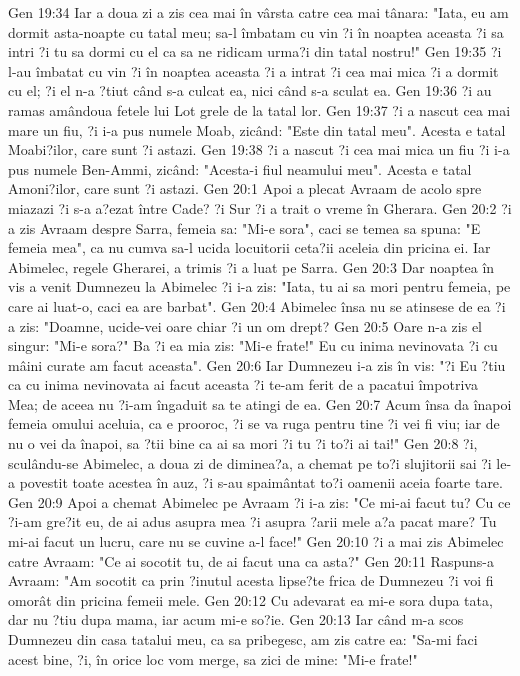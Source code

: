 Gen 19:34  Iar a doua zi a zis cea mai în vârsta catre cea mai tânara: "Iata, eu am dormit asta-noapte cu tatal meu; sa-l îmbatam cu vin ?i în noaptea aceasta ?i sa intri ?i tu sa dormi cu el ca sa ne ridicam urma?i din tatal nostru!"
Gen 19:35  ?i l-au îmbatat cu vin ?i în noaptea aceasta ?i a intrat ?i cea mai mica ?i a dormit cu el; ?i el n-a ?tiut când s-a culcat ea, nici când s-a sculat ea.
Gen 19:36  ?i au ramas amândoua fetele lui Lot grele de la tatal lor.
Gen 19:37  ?i a nascut cea mai mare un fiu, ?i i-a pus numele Moab, zicând: "Este din tatal meu". Acesta e tatal Moabi?ilor, care sunt ?i astazi.
Gen 19:38  ?i a nascut ?i cea mai mica un fiu ?i i-a pus numele Ben-Ammi, zicând: "Acesta-i fiul neamului meu". Acesta e tatal Amoni?ilor, care sunt ?i astazi.
Gen 20:1  Apoi a plecat Avraam de acolo spre miazazi ?i s-a a?ezat între Cade? ?i Sur ?i a trait o vreme în Gherara.
Gen 20:2  ?i a zis Avraam despre Sarra, femeia sa: "Mi-e sora", caci se temea sa spuna: "E femeia mea", ca nu cumva sa-l ucida locuitorii ceta?ii aceleia din pricina ei. Iar Abimelec, regele Gherarei, a trimis ?i a luat pe Sarra.
Gen 20:3  Dar noaptea în vis a venit Dumnezeu la Abimelec ?i i-a zis: "Iata, tu ai sa mori pentru femeia, pe care ai luat-o, caci ea are barbat".
Gen 20:4  Abimelec însa nu se atinsese de ea ?i a zis: "Doamne, ucide-vei oare chiar ?i un om drept?
Gen 20:5  Oare n-a zis el singur: "Mi-e sora?" Ba ?i ea mia zis: "Mi-e frate!" Eu cu inima nevinovata ?i cu mâini curate am facut aceasta".
Gen 20:6  Iar Dumnezeu i-a zis în vis: "?i Eu ?tiu ca cu inima nevinovata ai facut aceasta ?i te-am ferit de a pacatui împotriva Mea; de aceea nu ?i-am îngaduit sa te atingi de ea.
Gen 20:7  Acum însa da înapoi femeia omului aceluia, ca e prooroc, ?i se va ruga pentru tine ?i vei fi viu; iar de nu o vei da înapoi, sa ?tii bine ca ai sa mori ?i tu ?i to?i ai tai!"
Gen 20:8  ?i, sculându-se Abimelec, a doua zi de diminea?a, a chemat pe to?i slujitorii sai ?i le-a povestit toate acestea în auz, ?i s-au spaimântat to?i oamenii aceia foarte tare.
Gen 20:9  Apoi a chemat Abimelec pe Avraam ?i i-a zis: "Ce mi-ai facut tu? Cu ce ?i-am gre?it eu, de ai adus asupra mea ?i asupra ?arii mele a?a pacat mare? Tu mi-ai facut un lucru, care nu se cuvine a-l face!"
Gen 20:10  ?i a mai zis Abimelec catre Avraam: "Ce ai socotit tu, de ai facut una ca asta?"
Gen 20:11  Raspuns-a Avraam: "Am socotit ca prin ?inutul acesta lipse?te frica de Dumnezeu ?i voi fi omorât din pricina femeii mele.
Gen 20:12  Cu adevarat ea mi-e sora dupa tata, dar nu ?tiu dupa mama, iar acum mi-e so?ie.
Gen 20:13  Iar când m-a scos Dumnezeu din casa tatalui meu, ca sa pribegesc, am zis catre ea: "Sa-mi faci acest bine, ?i, în orice loc vom merge, sa zici de mine: "Mi-e frate!"
